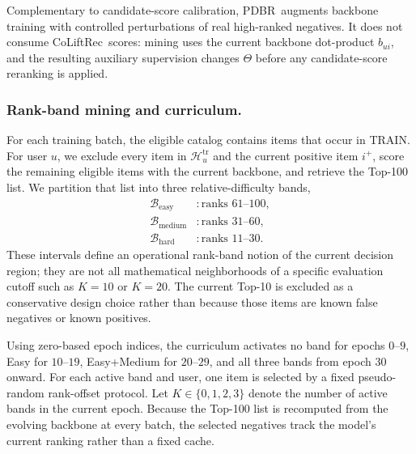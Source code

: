 \documentclass[sigconf,anonymous,review]{acmart}
\newcommand{\methodname}{CoLiftRec}
\newcommand{\pdbr}{PDBR}
\begin{document}
Complementary to candidate-score calibration, \pdbr\ augments backbone training with controlled perturbations of real high-ranked negatives.
It does not consume \methodname\ scores: mining uses the current backbone dot-product $b_{ui}$, and the resulting auxiliary supervision changes $\Theta$ before any candidate-score reranking is applied.

\subsubsection{Rank-band mining and curriculum.}
For each training batch, the eligible catalog contains items that occur in TRAIN.
For user $u$, we exclude every item in $\mathcal{H}^{\mathrm{tr}}_u$ and the current positive item $i^+$, score the remaining eligible items with the current backbone, and retrieve the Top-100 list.
We partition that list into three relative-difficulty bands,
\begin{equation}
\begin{aligned}
    \mathcal{B}_{\mathrm{easy}} &: \text{ranks }61\text{--}100,\\
    \mathcal{B}_{\mathrm{medium}} &: \text{ranks }31\text{--}60,\\
    \mathcal{B}_{\mathrm{hard}} &: \text{ranks }11\text{--}30.
\end{aligned}
\label{eq:bands}
\end{equation}
These intervals define an operational rank-band notion of the current decision region; they are not all mathematical neighborhoods of a specific evaluation cutoff such as $K=10$ or $K=20$.
The current Top-10 is excluded as a conservative design choice rather than because those items are known false negatives or known positives.

Using zero-based epoch indices, the curriculum activates no band for epochs $0$--$9$, Easy for $10$--$19$, Easy+Medium for $20$--$29$, and all three bands from epoch $30$ onward.
For each active band and user, one item is selected by a fixed pseudo-random rank-offset protocol.
Let $K\in\{0,1,2,3\}$ denote the number of active bands in the current epoch.
Because the Top-100 list is recomputed from the evolving backbone at every batch, the selected negatives track the model's current ranking rather than a fixed cache.
\end{document}
